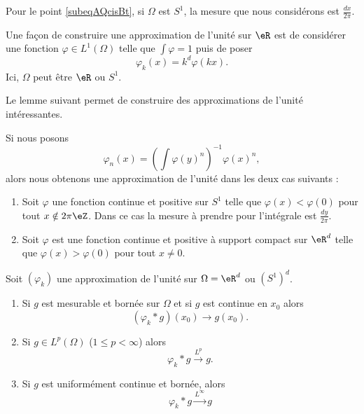 Pour le point \eqref{subeqAQcisBt}, si \( \Omega\) est \( S^1\), la mesure que nous considérons est \( \frac{ dx }{ 2\pi }\).


\begin{example}
    Une façon de construire une approximation de l'unité sur \( \eR\) est de considérer une fonction \( \varphi\in L^1(\Omega)\) telle que \( \int\varphi=1\) puis de poser
    \begin{equation}
        \varphi_k(x)=k^d\varphi(kx).
    \end{equation}
    Ici, \( \Omega\) peut être \( \eR\) ou \( S^1\).
\end{example}

Le lemme suivant permet de construire des approximations de l'unité intéressantes.
\begin{lemma}   \label{LemCNjIYhv}
    Si nous posons
    \begin{equation}
        \varphi_n(x)=\left( \int\varphi(y)^n \right)^{-1}\varphi(x)^n,
    \end{equation}
    alors nous obtenons une approximation de l'unité dans les deux cas suivants :
    \begin{enumerate}
        \item
            Soit \( \varphi\) une fonction continue et positive sur \( S^1\) telle que \( \varphi(x)<\varphi(0)\) pour tout \( x\notin 2\pi \eZ\). Dans ce cas la mesure à prendre pour l'intégrale est \( \frac{ dy }{ 2\pi }\).
        \item
            Soit \( \varphi\) est une fonction continue et positive à support compact sur \( \eR^d\) telle que \( \varphi(x)>\varphi(0)\) pour tout \( x\neq 0\).

    \end{enumerate}
\end{lemma}

\begin{theorem} \label{ThoYQbqEez}
    Soit \( (\varphi_k)\) une approximation de l'unité sur \( \Omega=\eR^d\) ou \( (S^1)^d\).
    \begin{enumerate}
        \item
            Si \( g\) est mesurable et bornée sur \( \Omega\) et si \( g\) est continue en \( x_0\) alors
            \begin{equation}
                (\varphi_k*g)(x_0)\to g(x_0).
            \end{equation}
        \item
            Si \( g\in L^p(\Omega)\) (\( 1\leq p<\infty\)) alors
            \begin{equation}
                \varphi_k*g\stackrel{L^p}{\to}g.
            \end{equation}
        \item
            Si \( g\) est uniformément continue et bornée, alors
            \begin{equation}
                \varphi_k*g\stackrel{L^{\infty}}{\to}g
            \end{equation}
    \end{enumerate}
\end{theorem}

